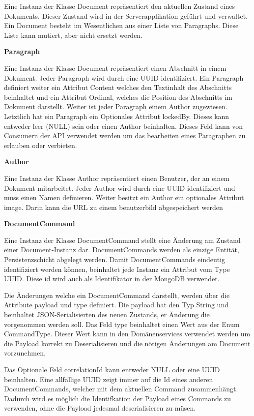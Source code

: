 Eine Instanz der Klasse Document repräsentiert den aktuellen Zustand eines Dokuments.
Dieser Zustand wird in der Serverapplikation geführt und verwaltet.
Ein Document besteht im Wesentlichen aus einer Liste von Paragraphs.
Diese Liste kann mutiert, aber nicht ersetzt werden.

\textbf{Paragraph}

Eine Instanz der Klasse Document repräsentiert einen Abschnitt in einem Dokument.
Jeder Paragraph wird durch eine UUID identifiziert.
Ein Paragraph definiert weiter ein Attribut Content welches den Textinhalt des Abschnitts beinhaltet und ein Attribut Ordinal, welches die Position des Abschnitts im Dokument darstellt.
Weiter ist jeder Paragraph einem Author zugewiesen.
Letztlich hat ein Paragraph ein Optionales Attribut lockedBy.
Dieses kann entweder leer (NULL) sein oder einen Author beinhalten.
Dieses Feld kann von Consumern der API verwendet werden um das bearbeiten eines Paragraphen zu erlauben oder verbieten.

\textbf{Author}

Eine Instanz der Klasse Author repräsentiert einen Benutzer, der an einem Dokument mitarbeitet.
Jeder Author wird durch eine UUID identifiziert und muss einen Namen definieren.
Weiter besitzt ein Author ein optionales Attribut image.
Darin kann die URL zu einem benutzerbild abgespeichert werden

\clearpage

\textbf{DocumentCommand}

Eine Instanz der Klasse DocumentCommand stellt eine Änderung am Zustand einer Document-Instanz dar.
DocumentCommands werden als einzige Entität, Persistenzschicht abgelegt werden.
Damit DocumentCommands eindeutig identifiziert werden können, beinhaltet jede Instanz ein Attribut vom Type UUID.
Diese id wird auch als Identifikator in der MongoDB verwendet.

Die Änderungen welche ein DocumentCommand darstellt, werden über die Attribute payload und type definiert.
Die payload hat den Typ String und beinhaltet JSON-Serialisierten des neuen Zustands, er Änderung die vorgenommen werden soll.
Das Feld type beinhaltet einen Wert aus der Enum CommandType.
Dieser Wert kann in den Domänenservices verwendet werden um die Payload korrekt zu Deserialisieren und die nötigen Änderungen am Document vorzunehmen.

Das Optionale Feld correlationId kann entweder NULL oder eine UUID beinhalten.
Eine allfällige UUID zeigt immer auf die Id eines anderen DocumentCommands, welcher mit dem aktuellen Command zusammenhängt.
Dadurch wird es möglich die Identifkation der Payload eines Commands zu verwenden, ohne die Payload jedesmal deserialisieren zu müsen.

